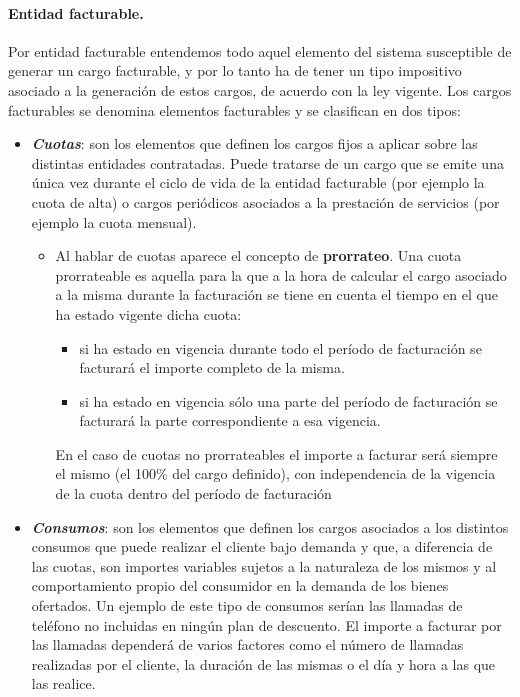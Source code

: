 \paragraph{Entidad facturable.} Por entidad facturable entendemos todo aquel elemento del sistema susceptible de generar un cargo facturable, y por lo tanto ha de tener un tipo impositivo asociado a la generación de estos cargos, de acuerdo con la ley vigente. Los cargos facturables se denomina elementos facturables y se clasifican en dos tipos:
\begin{itemize}
	\item \emph{\textbf{Cuotas}}: son los elementos que definen los cargos fijos a aplicar sobre las distintas entidades contratadas. Puede tratarse de un cargo que se emite una única vez durante el ciclo de vida de la entidad facturable (por ejemplo la cuota de alta) o cargos periódicos asociados a la prestación de servicios (por ejemplo la cuota mensual).
	\begin{itemize}
		\item Al hablar de cuotas aparece el concepto de \textbf{prorrateo}. Una cuota prorrateable es aquella para la que a la hora de calcular el cargo asociado a la misma durante la facturación se tiene en cuenta el tiempo en el que ha estado vigente dicha cuota: 
		\begin{itemize}
			\item si ha estado en vigencia durante todo el período de facturación se 		facturará el importe completo de la misma.
			\item si ha estado en vigencia sólo una parte del período de facturación se facturará la parte correspondiente a esa vigencia. 
		\end{itemize}
		En el caso de cuotas no prorrateables el importe a facturar será siempre el mismo (el 100\% del cargo definido), con independencia de la vigencia de la cuota dentro del período de facturación
	\end{itemize}
	\item \emph{\textbf{Consumos}}: son los elementos que definen los cargos asociados a los distintos consumos que puede realizar el cliente bajo demanda y que, a diferencia de las cuotas, son importes variables sujetos a la naturaleza de los mismos y al comportamiento propio del consumidor en la demanda de los bienes ofertados. Un ejemplo de este tipo de consumos serían las llamadas de teléfono no incluidas en ningún plan de descuento. El importe a facturar por las llamadas dependerá de varios factores como el número de llamadas realizadas por el cliente, la duración de las mismas o el día y hora a las que las realice.
\end{itemize}


